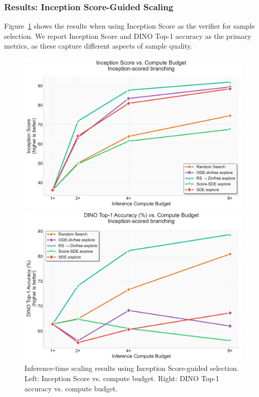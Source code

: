 \documentclass{article}
\begin{document}
\subsubsection{Results: Inception Score-Guided Scaling}

Figure~\ref{fig:inception-scaling} shows the results when using Inception Score as the verifier for sample selection. We report Inception Score and DINO Top-1 accuracy as the primary metrics, as these capture different aspects of sample quality.

\begin{figure}[H]
  \centering
  \begin{minipage}{0.48\textwidth}
    \centering
    \includegraphics[width=\textwidth]{figures/scaling_inception_is.pdf}
  \end{minipage}
  \hfill
  \begin{minipage}{0.48\textwidth}
    \centering
    \includegraphics[width=\textwidth]{figures/scaling_inception_top1.pdf}
  \end{minipage}
  \caption{Inference-time scaling results using Inception Score-guided selection. Left: Inception Score vs. compute budget. Right: DINO Top-1 accuracy vs. compute budget.}
  \label{fig:inception-scaling}
\end{figure}
\end{document}
